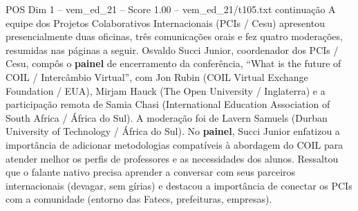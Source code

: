 \begin{textsample}{POS Dim 1 – vem\_ed\_21 – Score 1.00 – vem\_ed\_21/t105.txt}  \label{ex:f1_pos_039}
continuação A equipe dos Projetos Colaborativos Internacionais (PCIs / Cesu) apresentou presencialmente duas oficinas, três comunicações orais e fez quatro moderações, resumidas nas páginas a seguir.
Osvaldo Succi Junior, coordenador dos PCIs / Cesu, compôs o \textbf{painel} de encerramento da conferência, “What is the future of COIL / Intercâmbio Virtual”, com Jon Rubin (COIL Virtual Exchange Foundation / EUA), Mirjam Hauck (The Open University / Inglaterra) e a participação remota de Samia Chasi (International Education Association of South Africa / África do Sul).
A moderação foi de Lavern Samuels (Durban University of Technology / África do Sul).
No \textbf{painel}, Succi Junior enfatizou a importância de adicionar metodologias compatíveis à abordagem do COIL para atender melhor os perfis de professores e as necessidades dos alunos.
Ressaltou que o falante nativo precisa aprender a conversar com seus parceiros internacionais (devagar, sem gírias) e destacou a importância de conectar os PCIs com a comunidade (entorno das Fatecs, prefeituras, empresas).

\end{textsample}
